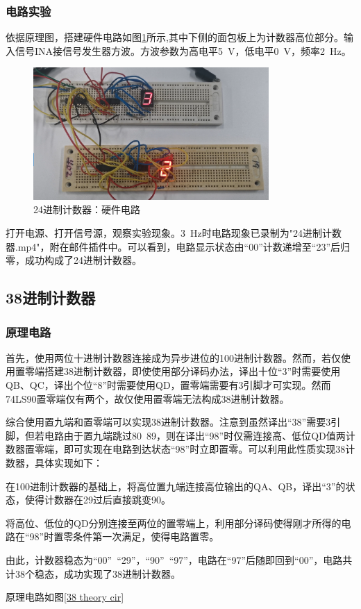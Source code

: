\documentclass[UTF8]{ctexart}
\numberwithin{figure}{subsection}
\numberwithin{table}{subsection}
\numberwithin{equation}{subsection}
\begin{document}
\subsubsection{电路实验}
\par 依据原理图，搭建硬件电路如图\ref{24 cir}所示,其中下侧的面包板上为计数器高位部分。输入信号INA接信号发生器方波。方波参数为高电平\SI{5}{\volt}，低电平\SI{0}{\volt}，频率\SI{2}{\hertz}。

\begin{figure}[H]
    \begin{center}
        \includegraphics[width=0.8\textwidth]{24.png}
    \end{center}
    \caption{24进制计数器：硬件电路}
    \label{24 cir}
\end{figure}

\par 打开电源、打开信号源，观察实验现象。\SI{3}{\hertz}时电路现象已录制为"24进制计数器.mp4"，附在邮件插件中。可以看到，电路显示状态由“00”计数递增至“23”后归零，成功构成了24进制计数器。

\subsection{38进制计数器}
\subsubsection{原理电路}
\par 首先，使用两位十进制计数器连接成为异步进位的100进制计数器。然而，若仅使用置零端搭建38进制计数器，即使使用部分译码办法，译出十位“3”时需要使用QB、QC，译出个位“8”时需要使用QD，置零端需要有3引脚才可实现。然而74LS90置零端仅有两个，故仅使用置零端无法构成38进制计数器。
\par 综合使用置九端和置零端可以实现38进制计数器。注意到虽然译出“38”需要3引脚，但若电路由于置九端跳过80~89，则在译出“98”时仅需连接高、低位QD值两计数器置零端，即可实现在电路到达状态“98”时立即置零。可以利用此性质实现38计数器，具体实现如下：
\par 在100进制计数器的基础上，将高位置九端连接高位输出的QA、QB，译出“3”的状态，使得计数器在29过后直接跳变90。
\par 将高位、低位的QD分别连接至两位的置零端上，利用部分译码使得刚才所得的电路在“98”时置零条件第一次满足，使得电路置零。
\par 由此，计数器稳态为“00”~“29”，“90”~“97”，电路在“97”后随即回到“00”，电路共计38个稳态，成功实现了38进制计数器。
\par 原理电路如图\ref{38 theory cir}
\end{document}
